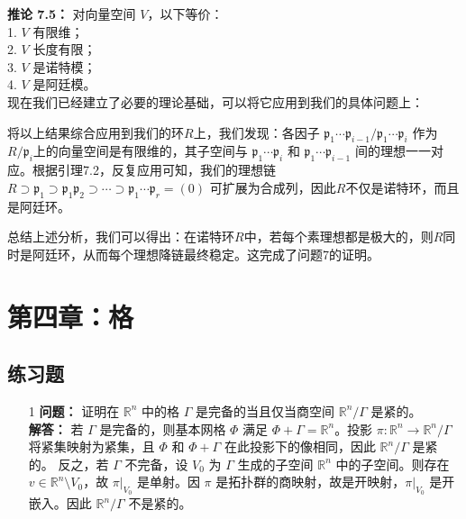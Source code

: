 \documentclass[UTF8]{ctexart}
\begin{document}
\begin{enumerate}
\begin{enumerate}
\textbf{推论 7.5：} 对向量空间 \(V\)，以下等价：\\
1. \(V\) 有限维；\\
2. \(V\) 长度有限；\\
3. \(V\) 是诺特模；\\
4. \(V\) 是阿廷模。\\

现在我们已经建立了必要的理论基础，可以将它应用到我们的具体问题上：

将以上结果综合应用到我们的环$R$上，我们发现：各因子 \(\mathfrak{p}_1 \cdots \mathfrak{p}_{i-1} / \mathfrak{p}_1 \cdots \mathfrak{p}_i\) 作为\(R/\mathfrak{p}_i\)上的向量空间是有限维的，其子空间与 \(\mathfrak{p}_1 \cdots \mathfrak{p}_i\) 和 \(\mathfrak{p}_1 \cdots \mathfrak{p}_{i-1}\) 间的理想一一对应。根据引理7.2，反复应用可知，我们的理想链 \(R \supset \mathfrak{p}_1 \supset \mathfrak{p}_1 \mathfrak{p}_2 \supset \cdots \supset \mathfrak{p}_1 \cdots \mathfrak{p}_r = (0)\) 可扩展为合成列，因此$R$不仅是诺特环，而且是阿廷环。

总结上述分析，我们可以得出：在诺特环$R$中，若每个素理想都是极大的，则$R$同时是阿廷环，从而每个理想降链最终稳定。这完成了问题7的证明。

\end{enumerate}

\section{第四章：格}

\subsection{练习题}
\begin{enumerate}

\item[1] 
\textbf{问题：} 证明在 \(\mathbb{R}^n\) 中的格 \(\Gamma\) 是完备的当且仅当商空间 \(\mathbb{R}^n / \Gamma\) 是紧的。\\
\textbf{解答：} 若 \(\Gamma\) 是完备的，则基本网格 \(\Phi\) 满足 \(\Phi + \Gamma = \mathbb{R}^n\)。投影 \(\pi: \mathbb{R}^n \to \mathbb{R}^n / \Gamma\) 将紧集映射为紧集，且 \(\Phi\) 和 \(\Phi + \Gamma\) 在此投影下的像相同，因此 \(\mathbb{R}^n / \Gamma\) 是紧的。  
反之，若 \(\Gamma\) 不完备，设 \(V_0\) 为 \(\Gamma\) 生成的子空间 \(\mathbb{R}^n\) 中的子空间。则存在 \(v \in \mathbb{R}^n \setminus V_0\)，故 \(\pi|_{V_0}\) 是单射。因 \(\pi\) 是拓扑群的商映射，故是开映射，\(\pi|_{V_0}\) 是开嵌入。因此 \(\mathbb{R}^n / \Gamma\) 不是紧的。


\end{enumerate}
\end{enumerate}
\end{document}
